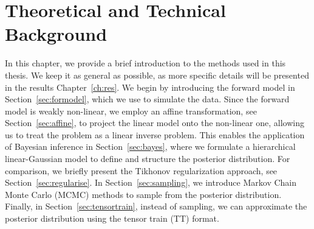 \the\columnwidth
\chapter{Theoretical and Technical Background}
\label{ch:background}
In this chapter, we provide a brief introduction to the methods used in this thesis. We keep it as general as possible, as more specific details will be presented in the results Chapter~\ref{ch:res}.
We begin by introducing the forward model in Section~\ref{sec:formodel}, which we use to simulate the data. Since the forward model is weakly non-linear, we employ an affine transformation, see Section~\ref{sec:affine}, to project the linear model onto the non-linear one, allowing us to treat the problem as a linear inverse problem.
This enables the application of Bayesian inference in Section~\ref{sec:bayes}, where we formulate a hierarchical linear-Gaussian model to define and structure the posterior distribution.
For comparison, we briefly present the Tikhonov regularization approach, see Section~\ref{sec:regularise}.
In Section~\ref{sec:sampling}, we introduce Markov Chain Monte Carlo (MCMC) methods to sample from the posterior distribution.
Finally, in Section~\ref{sec:tensortrain}, instead of sampling, we can approximate the posterior distribution using the tensor train (TT) format.






